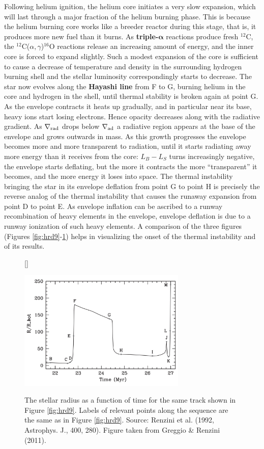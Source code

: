\documentclass[a4paper,10pt]{article}
\begin{document}
{\noindent}Following helium ignition, the helium core initiates a very slow expansion, which will last through a major fraction of the helium burning phase. This is because the helium burning core works like a breeder reactor during this stage, that is, it produces more new fuel than it burns. As \textbf{triple-$\mathbf{α}$} reactions produce fresh $^{12}$C, the $^{12}$C($\alpha,\gamma$)$^{16}$O reactions release an increasing amount of energy, and the inner core is forced to expand slightly. Such a modest expansion of the core is sufficient to cause a decrease of temperature and density in the surrounding hydrogen burning shell and the stellar luminosity correspondingly starts to decrease. The star now evolves along the \textbf{Hayashi line} from F to G, burning helium in the core and hydrogen in the shell, until thermal stability is broken again at point G. As the envelope contracts it heats up gradually, and in particular near its base, heavy ions start losing electrons. Hence opacity decreases along with the radiative gradient. As $\nabla_{\rm rad}$ drops below $\nabla_{\rm ad}$ a radiative region appears at the base of the envelope and grows outwards in mass. As this growth progresses the envelope becomes more and more transparent to radiation, until it starts radiating away more energy than it receives from the core: $L_B-L_S$ turns increasingly negative, the envelope starts deflating, but the more it contracts the more ``transparent'' it becomes, and the more energy it loses into space. The thermal instability bringing the star in its envelope deflation from point G to point H is precisely the reverse analog of the thermal instability that causes the runaway expansion from point D to point E. As envelope inflation can be ascribed to a runway recombination of heavy elements in the envelope, envelope deflation is due to a runway ionization of such heavy elements. A comparison of the three figures (Figures \ref{fig:hrd9}-\ref{fig:rvst}) helps in visualizing the onset of the thermal instability and of its results.

\begin{figure}[h]
    [\FBwidth]
    {\caption{\footnotesize{The stellar radius as a function of time for the same track shown in Figure \ref{fig:hrd9}. Labels of relevant points along the sequence are the same as in Figure \ref{fig:hrd9}. Source: Renzini et al. (1992, Astrophys. J., 400, 280). Figure taken from Greggio \& Renzini (2011).}}
    \label{fig:rvst}}
    {\includegraphics[width=8cm]{figures/RvsT.png}}
\end{figure}
\end{document}
